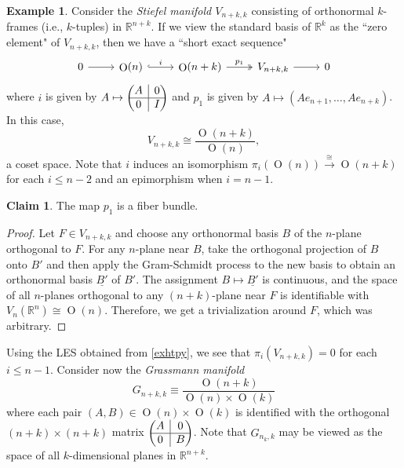 \documentclass[10pt,letterpaper,cm]{nupset}
\theoremstyle{definition}
\newtheorem{exmp}[defn]{Example}
\theoremstyle{theorem}
\newtheorem*{claim}{Claim}
\theoremstyle{remark}
\newcommand{\R}{\mathbb{R}}
\newcommand{\1}{\mathbb{1}}
\newcommand{\0}{\vec 0}
\DeclareMathOperator{\Or}{O}
\newcommand{\rvline}{\hspace*{-\arraycolsep}\vline\hspace*{-\arraycolsep}}
\begin{document}
\begin{exmp}
Consider the \textit{Stiefel manifold $V_{n+k,k}$} consisting of orthonormal $k$-frames (i.e., $k$-tuples) in $\R^{n+k}$. If we view the standard basis of $\R^k$ as the ``zero element" of $V_{n+k,k}$, then we have a ``short exact sequence"
\[
\begin{tikzcd}
0 \arrow[r] & \Or(n) \arrow[r, "i", hook] & \Or(n+k) \arrow[r, "p_1", two heads] & {V_{n+k, k}} \arrow[r] & 0
\end{tikzcd}
\] where $i$ is given by $A \mapsto 
\begin{pmatrix}
  \begin{matrix}
 A
  \end{matrix}
  & \rvline & 0 \\
\hline
  0 & \rvline &
  \begin{matrix}
 I
  \end{matrix}
\end{pmatrix}$
and $p_1$ is given by $A \mapsto \left(A{e_{n+1}}, \ldots, A{e_{n+k}}\right)$. In this case, $$V_{n+k, k} \cong \frac{\Or(n +k)}{\Or(n)},$$ a coset space. Note that $i$ induces an isomorphism $\pi_i(\Or(n)) \overset{\cong}{\longrightarrow} \Or(n+k)$ for each $i\leq n-2$ and an epimorphism when $i = n-1$. 
\begin{claim}
The map $p_1$ is a fiber bundle.
\end{claim}
\begin{proof}
Let $F \in V_{n+k, k}$ and choose any orthonormal basis $B$ of the $n$-plane orthogonal to $F$. For any $n$-plane near $B$, take the orthogonal projection of $B$ onto $B'$ and then apply the Gram-Schmidt process to the new basis to obtain an orthonormal basis $\underline{B'}$ of $B'$. The assignment $B \mapsto \underline{B'}$ is continuous, and the space of all $n$-planes orthogonal to any $\left(n+k\right)$-plane near $F$ is identifiable with $V_n(\R^n) \cong \Or(n)$. Therefore, we get a trivialization around $F$, which was arbitrary.
\end{proof}
Using the LES obtained from \cref{exhtpy}, we see that $\pi_i(V_{n+k, k}) =0$ for each $i\leq n-1$. Consider now the \textit{Grassmann manifold} $$G_{n+k, k}\equiv \frac{\Or(n+k)}{\Or(n)\times \Or(k)}$$ where each pair $\left(A, B\right) \in \Or(n)\times \Or(k)$ is identified with the orthogonal $\left(n+k\right)\times \left(n+k\right)$ matrix $\begin{pmatrix}
  \begin{matrix}
 A
  \end{matrix}
  & \rvline & 0 \\
\hline
  0 & \rvline &
  \begin{matrix}
B
  \end{matrix}
\end{pmatrix}$. Note that $G_{n_k, k}$  may be viewed as the space of all $k$-dimensional planes in $\R^{n+k}$. 


\end{exmp}
\end{document}
